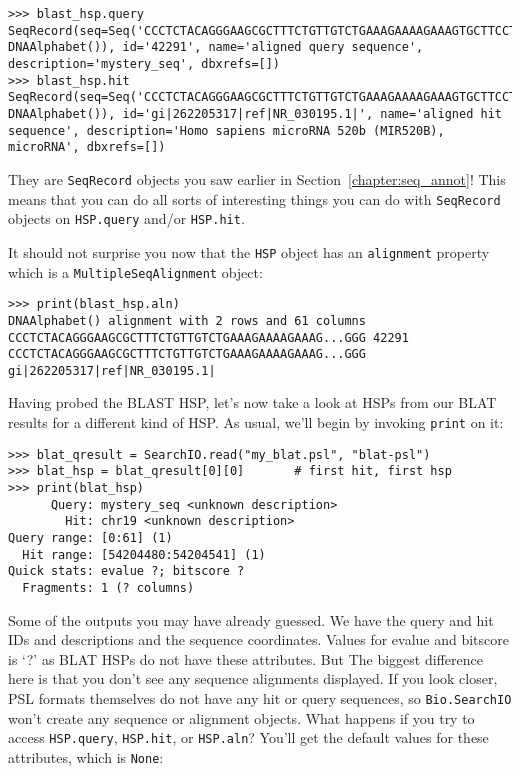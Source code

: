 \begin{verbatim}
>>> blast_hsp.query
SeqRecord(seq=Seq('CCCTCTACAGGGAAGCGCTTTCTGTTGTCTGAAAGAAAAGAAAGTGCTTCCTTT...GGG', DNAAlphabet()), id='42291', name='aligned query sequence', description='mystery_seq', dbxrefs=[])
>>> blast_hsp.hit
SeqRecord(seq=Seq('CCCTCTACAGGGAAGCGCTTTCTGTTGTCTGAAAGAAAAGAAAGTGCTTCCTTT...GGG', DNAAlphabet()), id='gi|262205317|ref|NR_030195.1|', name='aligned hit sequence', description='Homo sapiens microRNA 520b (MIR520B), microRNA', dbxrefs=[])
\end{verbatim}

They are \verb|SeqRecord| objects you saw earlier in
Section~\ref{chapter:seq_annot}! This means that you can do all sorts of
interesting things you can do with \verb|SeqRecord| objects on \verb|HSP.query|
and/or \verb|HSP.hit|.

It should not surprise you now that the \verb|HSP| object has an
\verb|alignment| property which is a \verb|MultipleSeqAlignment| object:

\begin{verbatim}
>>> print(blast_hsp.aln)
DNAAlphabet() alignment with 2 rows and 61 columns
CCCTCTACAGGGAAGCGCTTTCTGTTGTCTGAAAGAAAAGAAAG...GGG 42291
CCCTCTACAGGGAAGCGCTTTCTGTTGTCTGAAAGAAAAGAAAG...GGG gi|262205317|ref|NR_030195.1|
\end{verbatim}

Having probed the BLAST HSP, let's now take a look at HSPs from our BLAT
results for a different kind of HSP. As usual, we'll begin by invoking
\verb|print| on it:

\begin{verbatim}
>>> blat_qresult = SearchIO.read("my_blat.psl", "blat-psl")
>>> blat_hsp = blat_qresult[0][0]       # first hit, first hsp
>>> print(blat_hsp)
      Query: mystery_seq <unknown description>
        Hit: chr19 <unknown description>
Query range: [0:61] (1)
  Hit range: [54204480:54204541] (1)
Quick stats: evalue ?; bitscore ?
  Fragments: 1 (? columns)
\end{verbatim}

Some of the outputs you may have already guessed. We have the query and hit IDs
and descriptions and the sequence coordinates. Values for evalue and bitscore is
`?' as BLAT HSPs do not have these attributes. But The biggest difference here
is that you don't see any sequence alignments displayed. If you look closer, PSL
formats themselves do not have any hit or query sequences, so
\verb|Bio.SearchIO| won't create any sequence or alignment objects. What happens
if you try to access \verb|HSP.query|, \verb|HSP.hit|, or \verb|HSP.aln|?
You'll get the default values for these attributes, which is \verb|None|:

